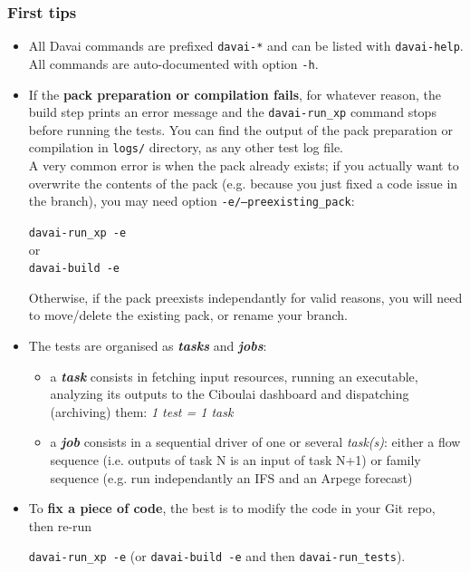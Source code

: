 \documentclass[a4paper,10pt,twoside]{article}
\begin{document}
\subsubsection{First tips}
\begin{itemize}
 \item All Davai commands are prefixed \texttt{davai-*} and can be listed with \texttt{davai-help}. All commands are auto-documented with option \texttt{-h}.
 \item If the \textbf{pack preparation or compilation fails}, for whatever reason, the build step prints an error message and the \texttt{davai-run\_xp} command stops before running the tests. You can find the output of the pack preparation or compilation in \texttt{logs/} directory, as any other test log file.\\
 A very common error is when the pack already exists; if you actually want to overwrite the contents of the pack (e.g. because you just fixed a code issue in the branch), you may need option \texttt{-e/--preexisting\_pack}:
 
 \texttt{davai-run\_xp -e}\\
 or\\
 \texttt{davai-build -e}
 
 Otherwise, if the pack preexists independantly for valid reasons, you will need to move/delete the existing pack, or rename your branch.
 \item The tests are organised as \textit{\textbf{tasks}} and \textit{\textbf{jobs}}:
  \begin{itemize}
   \item a \textit{\textbf{task}} consists in fetching input resources, running an executable, analyzing its outputs to the Ciboulai dashboard and dispatching (archiving) them: \textit{1 test = 1 task}
   \item a \textit{\textbf{job}} consists in a sequential driver of one or several \textit{task(s)}: either a flow sequence (i.e. outputs of task N is an input of task N+1) or family sequence (e.g. run independantly an IFS and an Arpege forecast)
  \end{itemize}
 \item To \textbf{fix a piece of code}, the best is to modify the code in your Git repo, then re-run
 
 \texttt{davai-run\_xp -e} (or \texttt{davai-build -e} and then \texttt{davai-run\_tests}).
 

\end{itemize}
\end{document}
